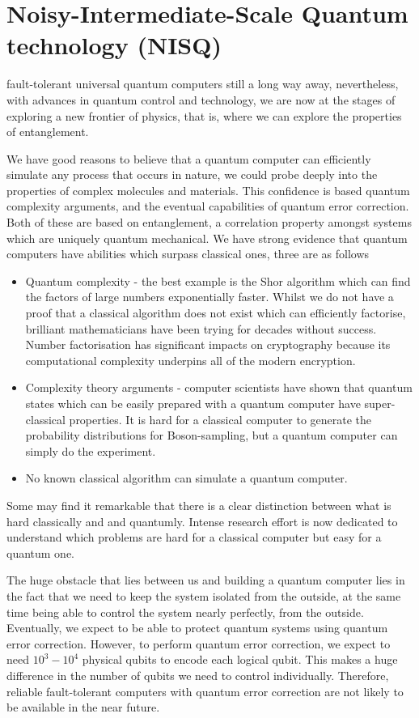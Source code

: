 \section{Noisy-Intermediate-Scale Quantum technology (NISQ)}

 fault-tolerant universal quantum computers still a long way away, nevertheless, 
with advances in quantum control and technology,
we are now at the stages of exploring a new frontier of physics, that is, where we can
explore the properties of entanglement.

We have good reasons to believe that a quantum computer can efficiently simulate any process that occurs in nature, we could probe deeply into the properties of complex molecules and materials. This confidence is based quantum complexity arguments, and the eventual capabilities of quantum error correction. Both of these are based on entanglement, a correlation property amongst systems which are uniquely quantum mechanical. We have strong evidence that quantum computers have abilities which surpass classical ones, three are as follows
\begin{itemize}
\item Quantum complexity - the best example is the Shor algorithm \cite{shor1994algorithms} which can find the factors of large numbers exponentially faster. Whilst we do not have a proof that a classical algorithm does not exist which can efficiently factorise, brilliant mathematicians have been trying for decades without success. Number factorisation has significant impacts on cryptography because its computational complexity underpins all of the modern encryption. 
% 
\item Complexity theory arguments - computer scientists have shown that quantum states which can be easily prepared with a quantum computer have super-classical properties. It is hard for a classical computer to generate the probability distributions for Boson-sampling, but a quantum computer can simply do the experiment.
% 
\item No known classical algorithm can simulate a quantum computer.
\end{itemize}

Some may find it remarkable that there is a clear distinction between what is hard classically and and quantumly. Intense research effort is now dedicated to understand which problems are hard for a classical computer but easy for a quantum one.


The huge obstacle that lies between us and building a quantum computer lies in the fact that we need to keep the system isolated from the outside, at the same time being able to control the system nearly perfectly, from the outside. Eventually, we expect to be able to protect quantum systems using quantum error correction. However, to perform quantum error correction, we expect to need $10^3 - 10^4$ physical qubits to encode each logical qubit. This makes a huge difference in the number of qubits we need to control individually. Therefore, reliable fault-tolerant computers with quantum error correction are not likely to be available in the near future.



